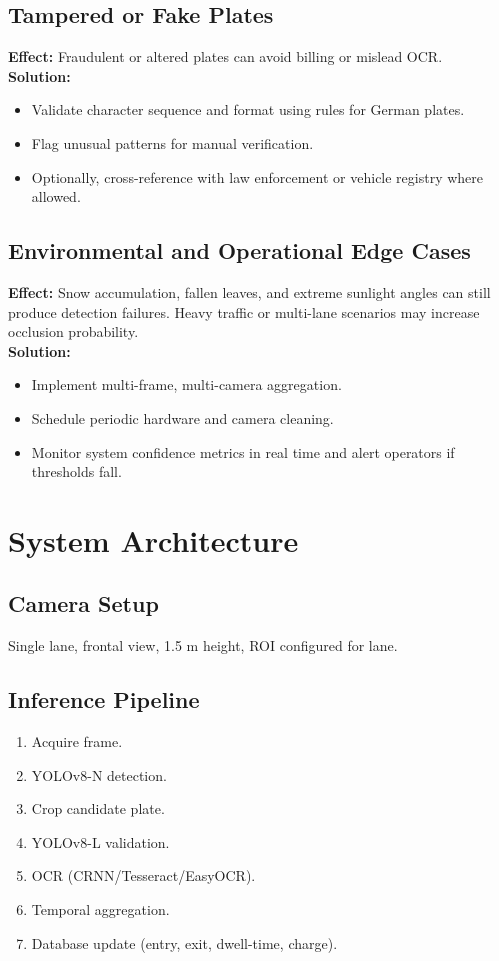 	\subsection{Tampered or Fake Plates}
	\textbf{Effect:} Fraudulent or altered plates can avoid billing or mislead OCR. \\
	\textbf{Solution:} 
	\begin{itemize}
		\item Validate character sequence and format using rules for German plates.
		\item Flag unusual patterns for manual verification.
		\item Optionally, cross-reference with law enforcement or vehicle registry where allowed.
	\end{itemize}
	
	\subsection{Environmental and Operational Edge Cases}
	\textbf{Effect:} Snow accumulation, fallen leaves, and extreme sunlight angles can still produce detection failures. Heavy traffic or multi-lane scenarios may increase occlusion probability. \\
	\textbf{Solution:} 
	\begin{itemize}
		\item Implement multi-frame, multi-camera aggregation.
		\item Schedule periodic hardware and camera cleaning.
		\item Monitor system confidence metrics in real time and alert operators if thresholds fall.
	\end{itemize}
	
	\section{System Architecture}
	\subsection{Camera Setup}
	Single lane, frontal view, 1.5 m height, ROI configured for lane.
	
	\subsection{Inference Pipeline}
	\begin{enumerate}
		\item Acquire frame.
		\item YOLOv8-N detection.
		\item Crop candidate plate.
		\item YOLOv8-L validation.
		\item OCR (CRNN/Tesseract/EasyOCR).
		\item Temporal aggregation.
		\item Database update (entry, exit, dwell-time, charge).
	\end{enumerate}
	
